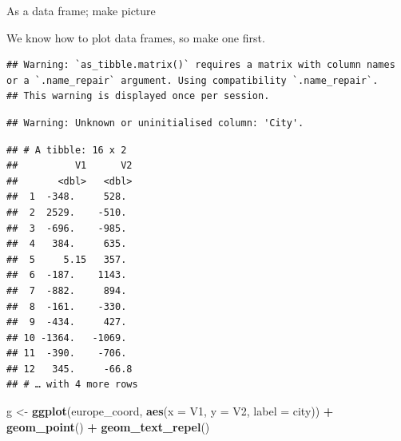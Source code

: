 \documentclass[ignorenonframetext,]{beamer}
\newenvironment{Shaded}{\begin{snugshade}}{\end{snugshade}}
\newcommand{\DataTypeTok}[1]{\textcolor[rgb]{0.13,0.29,0.53}{#1}}
\newcommand{\DecValTok}[1]{\textcolor[rgb]{0.00,0.00,0.81}{#1}}
\newcommand{\KeywordTok}[1]{\textcolor[rgb]{0.13,0.29,0.53}{\textbf{#1}}}
\newcommand{\NormalTok}[1]{#1}
\newcommand{\OperatorTok}[1]{\textcolor[rgb]{0.81,0.36,0.00}{\textbf{#1}}}
\newcommand{\StringTok}[1]{\textcolor[rgb]{0.31,0.60,0.02}{#1}}
\begin{document}
\begin{frame}[fragile]{As a data frame; make picture}
\protect\hypertarget{as-a-data-frame-make-picture}{}

We know how to plot data frames, so make one first.

\begin{Shaded}
\end{Shaded}

\begin{verbatim}
## Warning: `as_tibble.matrix()` requires a matrix with column names or a `.name_repair` argument. Using compatibility `.name_repair`.
## This warning is displayed once per session.
\end{verbatim}

\begin{verbatim}
## Warning: Unknown or uninitialised column: 'City'.
\end{verbatim}

\begin{verbatim}
## # A tibble: 16 x 2
##          V1      V2
##       <dbl>   <dbl>
##  1  -348.     528. 
##  2  2529.    -510. 
##  3  -696.    -985. 
##  4   384.     635. 
##  5     5.15   357. 
##  6  -187.    1143. 
##  7  -882.     894. 
##  8  -161.    -330. 
##  9  -434.     427. 
## 10 -1364.   -1069. 
## 11  -390.    -706. 
## 12   345.     -66.8
## # … with 4 more rows
\end{verbatim}

\begin{Shaded}
\begin{Highlighting}[]
\NormalTok{g <-}\StringTok{ }\KeywordTok{ggplot}\NormalTok{(europe_coord, }\KeywordTok{aes}\NormalTok{(}\DataTypeTok{x =}\NormalTok{ V1, }\DataTypeTok{y =}\NormalTok{ V2, }\DataTypeTok{label =}\NormalTok{ city)) }\OperatorTok{+}
\StringTok{  }\KeywordTok{geom_point}\NormalTok{() }\OperatorTok{+}\StringTok{ }\KeywordTok{geom_text_repel}\NormalTok{()}
\end{Highlighting}
\end{Shaded}

\end{frame}
\end{document}
